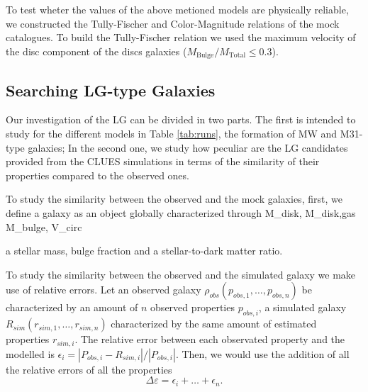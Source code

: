 \documentclass[usenatbib]{mn2e}
\begin{document}
To test wheter the values of the above metioned models are physically reliable, we constructed the Tully-Fischer and Color-Magnitude relations of the mock catalogues.
To build the Tully-Fischer relation we used the maximum velocity of the disc component of the discs galaxies ($M_{\text{Bulge}}/M_{\text{Total}}\le 0.3$).


\subsection{Searching LG-type Galaxies}
\label{sec:method:finding-lg}
Our investigation of the LG can be divided in two parts. The first is intended to study  for the  different models in Table \ref{tab:runs}, the formation
 of MW  and M31-type galaxies; In the second one, we study how peculiar are the LG candidates provided from the CLUES simulations in terms of the similarity
 of their properties compared to the observed ones.


To study the similarity between the observed and the mock galaxies, first, we define a galaxy as an object globally characterized through 
M_{disk,\star}   M_{disk,gas}    M_{bulge,\star}    V_{circ}


a stellar mass, bulge fraction 
and a stellar-to-dark matter ratio.

To study the similarity between the observed and the simulated galaxy we make use of relative errors. Let an observed galaxy $\rho_{obs}(p_{obs,1}, \dots ,p_{obs,n})$ 
be characterized by an amount of $n$ observed properties $p_{obs,i}$, a simulated galaxy $R_{sim}(r_{sim,1}, \dots,r_{sim,n})$ characterized by the same amount
 of  estimated properties $r_{sim,i}$. The relative error between each observated property and the modelled is $\epsilon_i=|P_{obs,i}-R_{sim,i}|/|P_{obs,i}|$. Then,
we would use the addition of all the relative errors of all the properties
\begin{equation}
 \Delta \varepsilon = \epsilon_i+\dots+\epsilon_n.\label{eq:relative_error}
\end{equation}

                                                                                                                                                                                                                                                                                                                                                                                                                                                                                                                                                                                  
\end{document}
